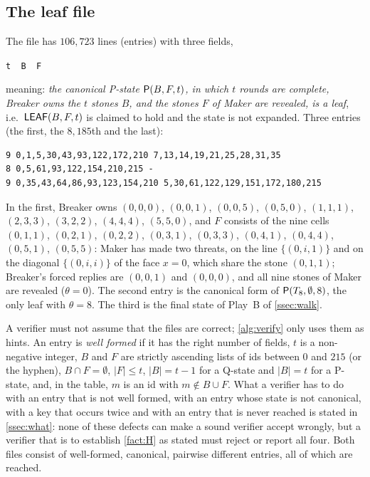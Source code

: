 \subsection{The leaf file}\label{ssec:fmt-leaves}

The file  has $106{,}723$ lines (entries) with three fields,
\begin{center}
\texttt{t\ \ B\ \ F}
\end{center}
meaning: \emph{the canonical P-state $\mathsf{P}(B,F,t)$, in which $t$ rounds are complete, Breaker owns the $t$
stones $B$, and the stones $F$ of Maker are revealed, is a leaf}, i.e.\ $\mathsf{LEAF}(B,F,t)$ is claimed to hold
and the
state is not expanded. Three entries (the first, the $8{,}185$th and the last):
\begin{verbatim}
9 0,1,5,30,43,93,122,172,210 7,13,14,19,21,25,28,31,35
8 0,5,61,93,122,154,210,215 -
9 0,35,43,64,86,93,123,154,210 5,30,61,122,129,151,172,180,215
\end{verbatim}
In the first, Breaker owns $(0,0,0)$, $(0,0,1)$, $(0,0,5)$, $(0,5,0)$, $(1,1,1)$, $(2,3,3)$, $(3,2,2)$,
$(4,4,4)$, $(5,5,0)$, and $F$ consists of the nine cells $(0,1,1)$, $(0,2,1)$, $(0,2,2)$, $(0,3,1)$,
$(0,3,3)$, $(0,4,1)$, $(0,4,4)$, $(0,5,1)$, $(0,5,5)$: Maker has made two threats, on the line $\{(0,i,1)\}$ and on the diagonal
$\{(0,i,i)\}$ of the face $x=0$, which share the stone $(0,1,1)$; Breaker's forced replies are $(0,0,1)$ and
$(0,0,0)$, and all nine stones of Maker are revealed ($\theta=0$). The second entry is the canonical form of
$\mathsf{P}(T_8,\emptyset,8)$, the only leaf with $\theta=8$. The third is the final state of Play~B of
\cref{ssec:walk}.

A verifier must not assume that the files are correct; \cref{alg:verify} only uses them as hints. An
entry is \emph{well formed} if it has the right number of fields, $t$ is a non-negative integer, $B$ and
$F$ are strictly ascending lists of ids between $0$ and $215$ (or the hyphen), $B\cap F=\emptyset$,
$|F|\le t$, $|B|=t-1$ for a Q-state and $|B|=t$ for a P-state, and, in the table, $m$ is an id with
$m\notin B\cup F$. What a verifier has to do with an entry that is not well formed, with an entry whose
state is not canonical, with a key that occurs twice and with an entry that is never reached is stated in
\cref{ssec:what}: none of these defects can make a sound verifier accept wrongly, but a verifier that is
to establish \cref{fact:H} as stated must reject or report all four. Both files consist of well-formed,
canonical, pairwise different entries, all of which are reached.

